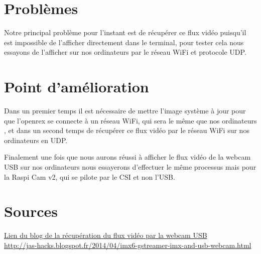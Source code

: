 \section{Problèmes}

Notre principal problème pour l’instant est de récupérer ce flux vidéo puisqu’il
est impossible de l’afficher directement dans le terminal, pour tester cela nous
essayons de l’afficher sur nos ordinateurs par le réseau WiFi et protocole UDP.

\section{Point d'amélioration}

Dans un premier temps il est nécessaire de mettre l’image système à jour pour
que l’openrex se connecte à un réseau WiFi, qui sera le même que nos ordinateurs
, et dans un second temps de récupérer ce flux vidéo par le réseau WiFi sur nos
ordinateurs en UDP.

Finalement une fois que nous aurons réussi à afficher le flux vidéo de la webcam
USB sur nos ordinateurs nous essayerons d’effectuer le même processus mais pour
la Raspi Cam v2, qui se pilote par le CSI et non l’USB.

\section{Sources}

\href{http://jas-hacks.blogspot.fr/2014/04/imx6-gstreamer-imx-and-usb-webcam.html}
{Lien du blog de la récupération du flux vidéo par la webcam USB \\
http://jas-hacks.blogspot.fr/2014/04/imx6-gstreamer-imx-and-usb-webcam.html}
